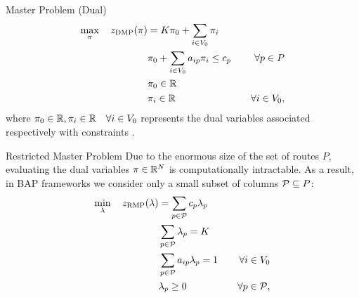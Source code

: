 \begin{frame}{Master Problem (Dual)}
	\begin{align}
		\max_{\pi} \quad z_{\mathrm{DMP}}(\pi) & =  K \pi_0 + \sum_{i \in V_0} \pi_i           & \label{eq:dmp-obj-func}                             \\
		                                 & \pi_0 + \sum_{i \in V_0} a_{ip} \pi_i \le c_p & \quad \forall p \in P \label{eq:dmp-constraint1}    \\
		                                 & \pi_0 \in \mathbb R                                  & \label{eq:dmp-constraint2}                          \\
		                                 & \pi_i \in \mathbb R                                  & \quad \forall i \in V_0 \label{eq:dmp-constraint3},
	\end{align}
	where $\pi_0 \in \mathbb R, \pi_i \in \mathbb R \quad \forall i \in V_0$ represents the dual variables
	associated respectively with constraints .
\end{frame}

\begin{frame}{Restricted Master Problem}
	Due to the enormous size of the set of routes $P$, evaluating the dual variables $\pi \in \mathbb R^{N}$ is computationally intractable.
	As a result, in BAP frameworks we consider only a small subset of columns $\mathcal{P} \subseteq P$:
	\begin{align}
		\min_{\lambda} \quad z_{\mathrm{RMP}}(\lambda) & = \sum_{p \in \mathcal{P}}  c_p \lambda_p      & \label{eq:rmp-obj-func}                                                                                                    \\
		                                         & \sum_{p \in \mathcal{P}} \lambda_{p} = K       & \label{eq:rmp-K-routes}                                                                                                    \\
		                                         & \sum_{p \in \mathcal{P}}  a_{ip} \lambda_p = 1 & \quad \forall i \in V_0                                              \label{eq:rmp-customers-visited-by-exactly-one-route} \\
		                                         & \lambda_p \ge 0                         & \quad \forall p \in \mathcal{P} \label{eq:rmp-lambda-mip-var-bounds},
	\end{align}
\end{frame}


